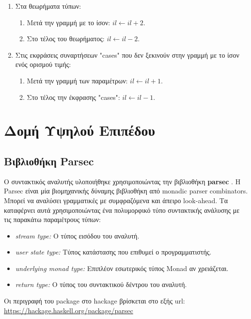 \documentclass[diploma]{softlab-thesis}
\begin{document}
\begin{enumerate}
\item
Στα θεωρήματα τύπων:
  \begin{enumerate}

  \item
  Μετά την γραμμή με το ίσον: $il \leftarrow il + 2$.

  \item
  Στο τέλος του θεωρήματος: $il \leftarrow il - 2$.
  \end{enumerate}

\item
Στις εκφράσεις συναρτήσεων "cases" που δεν ξεκινούν στην γραμμή με το ίσον
ενός ορισμού τιμής:
  \begin{enumerate}

  \item
  Μετά την γραμμή των παραμέτρων: $il \leftarrow il + 1$.

  \item
  Στο τέλος την έκφρασης "cases": $il \leftarrow il - 1$.

  \end{enumerate}

\end{enumerate}

\section{Δομή Υψηλού Επιπέδου}

\subsection{Βιβλιοθήκη Parsec}

Ο συντακτικός αναλυτής υλοποιήθηκε χρησιμοποιώντας την βιβλιοθήκη
\textbf{parsec} \cite{parsec}. Η Parsec είναι μία βιομηχανικής δύναμης
βιβλιοθήκη από monadic parser combinators. Μπορεί να αναλύσει
γραμματικές με συμφραζόμενα και άπειρο look-ahead. Τα καταφέρνει αυτά
χρησιμοποιώντας ένα πολυμορφικό τύπο συντακτικής ανάλυσης με τις παρακάτω
παραμέτρους τύπων:

\begin{itemize}
\item
  \textit{stream type:} Ο τύπος εισόδου του αναλυτή.
\item
  \textit{user state type:} Τύπος κατάστασης που επιθυμεί ο προγραμματιστής.
\item
  \textit{underlying monad type:}
  Επιπλέον εσωτερικός τύπος Monad αν χρειάζεται.
\item
  \textit{return type:} O τύπος του συντακτικού δέντρου του αναλυτή.
\end{itemize}
Οι περιγραφή του package στο hackage βρίσκεται στο εξής url:\\
\url{https://hackage.haskell.org/package/parsec}
\end{document}
